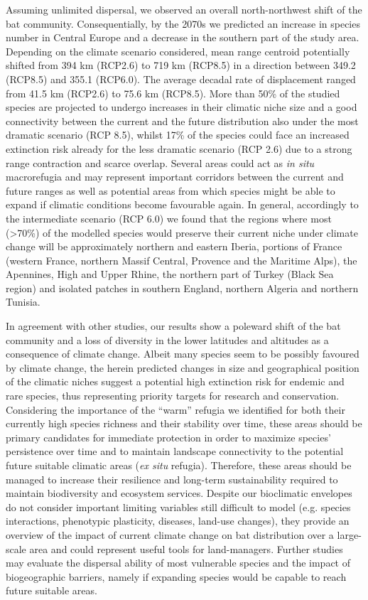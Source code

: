 {Assuming unlimited dispersal, we observed an overall north-northwest shift of the bat community. Consequentially, by the 2070s we predicted an increase in species number in Central Europe and a decrease in the southern part of the study area. Depending on the climate scenario considered, mean range centroid potentially shifted from 394 km (RCP2.6) to 719 km (RCP8.5) in a direction between 349.2\degree{} (RCP8.5) and 355.1\degree{} (RCP6.0). The average decadal rate of displacement ranged from 41.5 km (RCP2.6) to 75.6 km (RCP8.5). More than 50\% of the studied species are projected to undergo increases in their climatic niche size and a good connectivity between the current and the future distribution also under the most dramatic scenario (RCP 8.5), whilst 17\% of the species could face an increased extinction risk already for the less dramatic scenario (RCP 2.6) due to a strong range contraction and scarce overlap. Several areas could act as \textit{in situ} macrorefugia and may represent important corridors between the current and future ranges as well as potential areas from which species might be able to expand if climatic conditions become favourable again. In general, accordingly to the intermediate scenario (RCP 6.0) we found that the regions where most (>70\%) of the modelled species would preserve their current niche under climate change will be approximately northern and eastern Iberia, portions of France (western France, northern Massif Central, Provence and the Maritime Alps), the Apennines, High and Upper Rhine, the northern part of Turkey (Black Sea region) and isolated patches in southern England, northern Algeria and northern Tunisia.

In agreement with other studies, our results show a poleward shift of the  bat community and a loss of diversity in the lower latitudes and altitudes as a consequence of climate change. Albeit many species seem to be possibly favoured by climate change, the herein predicted changes in size and geographical position of the climatic niches suggest a potential high extinction risk for endemic and rare species, thus representing priority targets for research and conservation. Considering the importance of the  ``warm'' refugia we identified for both their currently high species richness and their stability over time, these areas should be primary candidates for immediate protection in order to maximize species’ persistence over time and to maintain landscape connectivity to the potential future suitable climatic areas (\textit{ex situ} refugia). Therefore, these areas should be managed to increase their resilience and long-term sustainability required to maintain biodiversity and ecosystem services. Despite our bioclimatic envelopes do not consider important limiting variables still difficult to model (e.g. species interactions, phenotypic plasticity, diseases, land-use changes), they provide an overview of the impact of current climate change on bat distribution over a large-scale area and could represent useful tools for land-managers. Further studies may evaluate the dispersal ability of most vulnerable species and the impact of biogeographic barriers, namely if expanding species would be capable to reach future suitable areas. 
} %